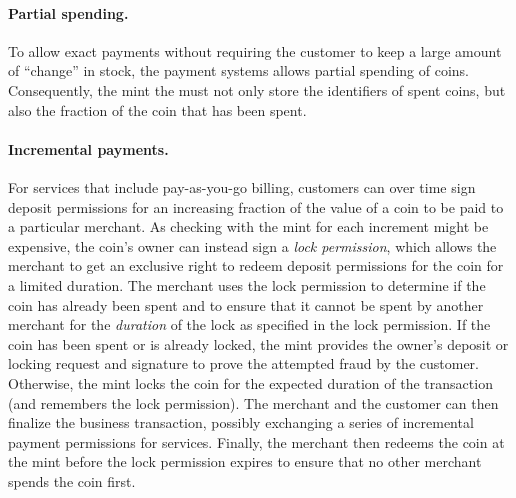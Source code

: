 \documentclass{llncs}
\begin{document}
\paragraph{Partial spending.}

To allow exact payments without requiring the customer to keep a large
amount of ``change'' in stock, the payment systems allows partial
spending of coins.  Consequently, the mint the must not only store the
identifiers of spent coins, but also the fraction of the coin that has
been spent.

%

\paragraph{Incremental payments.}

For services that include pay-as-you-go billing, customers can over
time sign deposit permissions for an increasing fraction of the value
of a coin to be paid to a particular merchant.  As checking with the
mint for each increment might be expensive, the coin's owner can
instead sign a {\em lock permission}, which allows the merchant to get
an exclusive right to redeem deposit permissions for the coin for a
limited duration.  The merchant uses the lock permission to determine
if the coin has already been spent and to ensure that it cannot be
spent by another merchant for the {\em duration} of the lock as
specified in the lock permission.  If the coin has been spent or is
already locked, the mint provides the owner's deposit or locking
request and signature to prove the attempted fraud by the customer.
Otherwise, the mint locks the coin for the expected duration of the
transaction (and remembers the lock permission).  The merchant and the
customer can then finalize the business transaction, possibly
exchanging a series of incremental payment permissions for services.
Finally, the merchant then redeems the coin at the mint before the
lock permission expires to ensure that no other merchant spends the
coin first.
\end{document}
